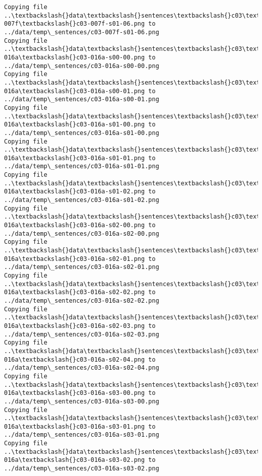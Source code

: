 \documentclass[11pt]{article}
\begin{document}
\begin{Verbatim}[commandchars=\\\{\}]
Copying file ..\textbackslash{}data\textbackslash{}sentences\textbackslash{}c03\textbackslash{}c03-007f\textbackslash{}c03-007f-s01-06.png to
../data/temp\_sentences/c03-007f-s01-06.png
Copying file ..\textbackslash{}data\textbackslash{}sentences\textbackslash{}c03\textbackslash{}c03-016a\textbackslash{}c03-016a-s00-00.png to
../data/temp\_sentences/c03-016a-s00-00.png
Copying file ..\textbackslash{}data\textbackslash{}sentences\textbackslash{}c03\textbackslash{}c03-016a\textbackslash{}c03-016a-s00-01.png to
../data/temp\_sentences/c03-016a-s00-01.png
Copying file ..\textbackslash{}data\textbackslash{}sentences\textbackslash{}c03\textbackslash{}c03-016a\textbackslash{}c03-016a-s01-00.png to
../data/temp\_sentences/c03-016a-s01-00.png
Copying file ..\textbackslash{}data\textbackslash{}sentences\textbackslash{}c03\textbackslash{}c03-016a\textbackslash{}c03-016a-s01-01.png to
../data/temp\_sentences/c03-016a-s01-01.png
Copying file ..\textbackslash{}data\textbackslash{}sentences\textbackslash{}c03\textbackslash{}c03-016a\textbackslash{}c03-016a-s01-02.png to
../data/temp\_sentences/c03-016a-s01-02.png
Copying file ..\textbackslash{}data\textbackslash{}sentences\textbackslash{}c03\textbackslash{}c03-016a\textbackslash{}c03-016a-s02-00.png to
../data/temp\_sentences/c03-016a-s02-00.png
Copying file ..\textbackslash{}data\textbackslash{}sentences\textbackslash{}c03\textbackslash{}c03-016a\textbackslash{}c03-016a-s02-01.png to
../data/temp\_sentences/c03-016a-s02-01.png
Copying file ..\textbackslash{}data\textbackslash{}sentences\textbackslash{}c03\textbackslash{}c03-016a\textbackslash{}c03-016a-s02-02.png to
../data/temp\_sentences/c03-016a-s02-02.png
Copying file ..\textbackslash{}data\textbackslash{}sentences\textbackslash{}c03\textbackslash{}c03-016a\textbackslash{}c03-016a-s02-03.png to
../data/temp\_sentences/c03-016a-s02-03.png
Copying file ..\textbackslash{}data\textbackslash{}sentences\textbackslash{}c03\textbackslash{}c03-016a\textbackslash{}c03-016a-s02-04.png to
../data/temp\_sentences/c03-016a-s02-04.png
Copying file ..\textbackslash{}data\textbackslash{}sentences\textbackslash{}c03\textbackslash{}c03-016a\textbackslash{}c03-016a-s03-00.png to
../data/temp\_sentences/c03-016a-s03-00.png
Copying file ..\textbackslash{}data\textbackslash{}sentences\textbackslash{}c03\textbackslash{}c03-016a\textbackslash{}c03-016a-s03-01.png to
../data/temp\_sentences/c03-016a-s03-01.png
Copying file ..\textbackslash{}data\textbackslash{}sentences\textbackslash{}c03\textbackslash{}c03-016a\textbackslash{}c03-016a-s03-02.png to
../data/temp\_sentences/c03-016a-s03-02.png

\end{Verbatim}
\end{document}

